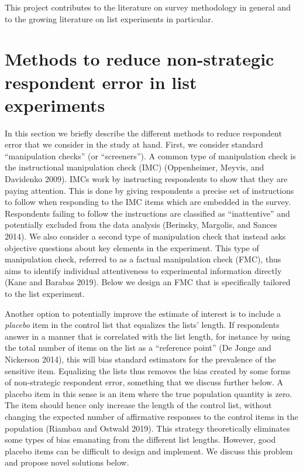 \documentclass[]{article}
\begin{document}
This project contributes to the literature on survey methodology in
general and to the growing literature on list experiments in particular.

\hypertarget{methods-to-reduce-non-strategic-respondent-error-in-list-experiments}{%
\section{Methods to reduce non-strategic respondent error in list
experiments}\label{methods-to-reduce-non-strategic-respondent-error-in-list-experiments}}

In this section we briefly describe the different methods to reduce
respondent error that we consider in the study at hand. First, we
consider standard ``manipulation checks'' (or ``screeners''). A common
type of manipulation check is the instructional manipulation check (IMC)
(Oppenheimer, Meyvis, and Davidenko 2009). IMCs work by instructing
respondents to show that they are paying attention. This is done by
giving respondents a precise set of instructions to follow when
responding to the IMC items which are embedded in the survey.
Respondents failing to follow the instructions are classified as
``inattentive'' and potentially excluded from the data analysis
(Berinsky, Margolis, and Sances 2014). We also consider a second type of
manipulation check that instead asks objective questions about key
elements in the experiment. This type of manipulation check, referred to
as a factual manipulation check (FMC), thus aims to identify individual
attentiveness to experimental information directly (Kane and Barabas
2019). Below we design an FMC that is specifically tailored to the list
experiment.

Another option to potentially improve the estimate of interest is to
include a \emph{placebo} item in the control list that equalizes the
lists' length. If respondents answer in a manner that is correlated with
the list length, for instance by using the total number of items on the
list as a ``reference point'' (De Jonge and Nickerson 2014), this will
bias standard estimators for the prevalence of the sensitive item.
Equalizing the lists thus removes the bias created by some forms of
non-strategic respondent error, something that we discuss further below.
A placebo item in this sense is an item where the true population
quantity is zero. The item should hence only increase the length of the
control list, without changing the expected number of affirmative
responses to the control items in the population (Riambau and Ostwald
2019). This strategy theoretically eliminates some types of bias
emanating from the different list lengths. However, good placebo items
can be difficult to design and implement. We discuss this problem and
propose novel solutions below.
\end{document}
